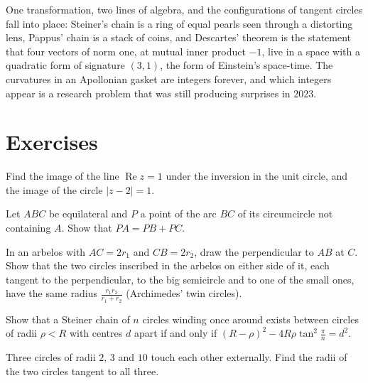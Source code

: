 \begin{beauty}
One transformation, two lines of algebra, and the configurations of tangent circles fall into place: Steiner's chain is a ring of equal
pearls seen through a distorting lens, Pappus' chain is a stack of coins, and Descartes' theorem is the statement that four vectors of norm
one, at mutual inner product $-1$, live in a space with a quadratic form of signature $(3,1)$, the form of Einstein's space-time. The
curvatures in an Apollonian gasket are integers forever, and which integers appear is a research problem that was still producing surprises
in 2023.
\end{beauty}

\section{Exercises}

\begin{exercise}[$\star$]\label{geometry:ex:invline}
Find the image of the line $\operatorname{Re}z=1$ under the inversion in the unit circle, and the image of the circle $|z-2|=1$.
\end{exercise}

\begin{exercise}[$\star$]\label{geometry:ex:vanschooten}
Let $ABC$ be equilateral and $P$ a point of the arc $BC$ of its circumcircle not containing $A$. Show that $PA=PB+PC$.
\end{exercise}

\begin{exercise}[$\star\star$]\label{geometry:ex:twins}
In an arbelos with $AC=2r_1$ and $CB=2r_2$, draw the perpendicular to $AB$ at $C$. Show that the two circles inscribed in the arbelos on
either side of it, each tangent to the perpendicular, to the big semicircle and to one of the small ones, have the same radius
$\frac{r_1r_2}{r_1+r_2}$ (Archimedes' twin circles).
\end{exercise}

\begin{exercise}[$\star\star$]\label{geometry:ex:steinerformula}
Show that a Steiner chain of $n$ circles winding once around exists between circles of radii $\rho<R$ with centres $d$ apart if and only if
$(R-\rho)^2-4R\rho\tan^2\frac\pi n=d^2$.
\end{exercise}

\begin{exercise}[$\star$]\label{geometry:ex:soddy}
Three circles of radii $2$, $3$ and $10$ touch each other externally. Find the radii of the two circles tangent to all three.
\end{exercise}

